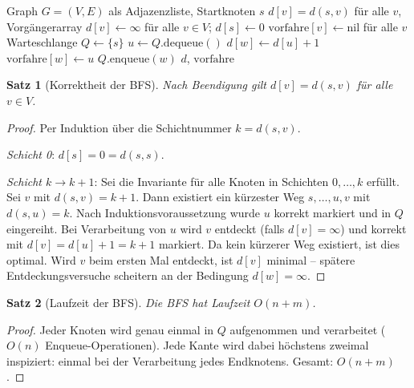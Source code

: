 ﻿\documentclass[a4paper,12pt,openany,oneside]{book}
\theoremstyle{definition}
\theoremstyle{plain}
\newtheorem{satz}{Satz}[chapter]
\theoremstyle{remark}
\begin{document}
\begin{algorithm}[H]
  \caption{Breitensuche (BFS)}
  \label{alg:bfs}
  \begin{algorithmic}[1]
    \Require Graph $G=(V,E)$ als Adjazenzliste, Startknoten $s$
    \Ensure $d[v] = d(s,v)$ f\"ur alle $v$, Vorg\"angerarray
    \State $d[v] \gets \infty$ f\"ur alle $v \in V$; $d[s] \gets 0$
    \State $\mathrm{vorfahre}[v] \gets \mathrm{nil}$ f\"ur alle $v$
    \State Warteschlange $Q \gets \{s\}$
      \State $u \gets Q.\mathrm{dequeue}()$
          \State $d[w] \gets d[u]+1$
          \State $\mathrm{vorfahre}[w] \gets u$
          \State $Q.\mathrm{enqueue}(w)$
        \EndIf
      \EndFor
    \EndWhile
    \State \Return $d$, $\mathrm{vorfahre}$
  \end{algorithmic}
\end{algorithm}

\begin{satz}[Korrektheit der BFS]
  Nach Beendigung gilt $d[v] = d(s,v)$ f\"ur alle $v \in V$.
\end{satz}

\begin{proof}
  Per Induktion \"uber die Schichtnummer $k = d(s,v)$.

  \emph{Schicht 0}: $d[s] = 0 = d(s,s)$. \checkmark

  \emph{Schicht $k \to k+1$}: Sei die Invariante f\"ur alle Knoten in
  Schichten $0,\ldots,k$ erf\"ullt. Sei $v$ mit $d(s,v) = k+1$. Dann
  existiert ein k\"urzester Weg $s, \ldots, u, v$ mit $d(s,u) = k$.
  Nach Induktionsvoraussetzung wurde $u$ korrekt markiert und
  in $Q$ eingereiht. Bei Verarbeitung von $u$ wird $v$ entdeckt
  (falls $d[v] = \infty$) und korrekt mit $d[v] = d[u]+1 = k+1$
  markiert. Da kein k\"urzerer Weg existiert, ist dies optimal.
  Wird $v$ beim ersten Mal entdeckt, ist $d[v]$ minimal -- sp\"atere
  Entdeckungsversuche scheitern an der Bedingung $d[w] = \infty$.
\end{proof}

\begin{satz}[Laufzeit der BFS]
  Die BFS hat Laufzeit $O(n+m)$.
\end{satz}

\begin{proof}
  Jeder Knoten wird genau einmal in $Q$ aufgenommen und verarbeitet
  ($O(n)$ Enqueue-Operationen). Jede Kante wird dabei h\"ochstens
  zweimal inspiziert: einmal bei der Verarbeitung jedes Endknotens.
  Gesamt: $O(n+m)$.
\end{proof}
\end{document}
